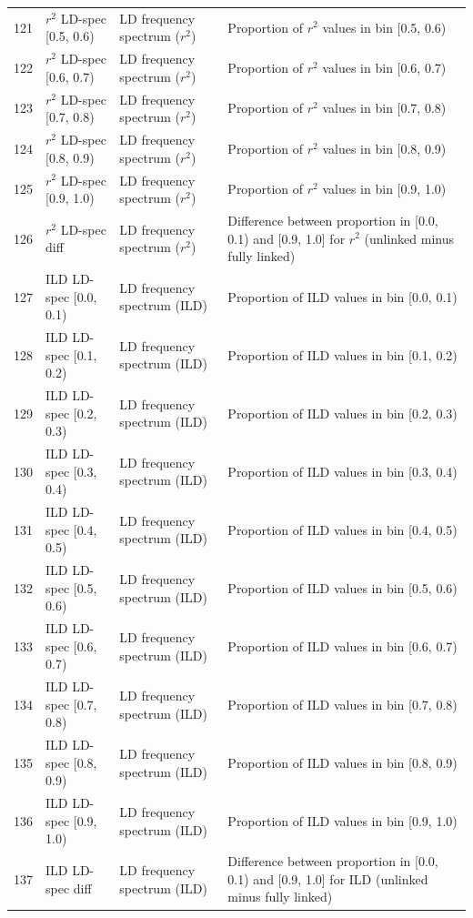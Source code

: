\begin{longtable}{@{}rllp{7.5cm}@{}}
121 & $r^2$ LD-spec [0.5, 0.6) & LD frequency spectrum ($r^2$) & Proportion of $r^2$ values in bin [0.5, 0.6) \\
122 & $r^2$ LD-spec [0.6, 0.7) & LD frequency spectrum ($r^2$) & Proportion of $r^2$ values in bin [0.6, 0.7) \\
123 & $r^2$ LD-spec [0.7, 0.8) & LD frequency spectrum ($r^2$) & Proportion of $r^2$ values in bin [0.7, 0.8) \\
124 & $r^2$ LD-spec [0.8, 0.9) & LD frequency spectrum ($r^2$) & Proportion of $r^2$ values in bin [0.8, 0.9) \\
125 & $r^2$ LD-spec [0.9, 1.0) & LD frequency spectrum ($r^2$) & Proportion of $r^2$ values in bin [0.9, 1.0) \\
126 & $r^2$ LD-spec diff & LD frequency spectrum ($r^2$) & Difference between proportion in [0.0, 0.1) and [0.9, 1.0] for $r^2$ (unlinked minus fully linked) \\
\midrule
127 & ILD LD-spec [0.0, 0.1) & LD frequency spectrum (ILD) & Proportion of ILD values in bin [0.0, 0.1) \\
128 & ILD LD-spec [0.1, 0.2) & LD frequency spectrum (ILD) & Proportion of ILD values in bin [0.1, 0.2) \\
129 & ILD LD-spec [0.2, 0.3) & LD frequency spectrum (ILD) & Proportion of ILD values in bin [0.2, 0.3) \\
130 & ILD LD-spec [0.3, 0.4) & LD frequency spectrum (ILD) & Proportion of ILD values in bin [0.3, 0.4) \\
131 & ILD LD-spec [0.4, 0.5) & LD frequency spectrum (ILD) & Proportion of ILD values in bin [0.4, 0.5) \\
132 & ILD LD-spec [0.5, 0.6) & LD frequency spectrum (ILD) & Proportion of ILD values in bin [0.5, 0.6) \\
133 & ILD LD-spec [0.6, 0.7) & LD frequency spectrum (ILD) & Proportion of ILD values in bin [0.6, 0.7) \\
134 & ILD LD-spec [0.7, 0.8) & LD frequency spectrum (ILD) & Proportion of ILD values in bin [0.7, 0.8) \\
135 & ILD LD-spec [0.8, 0.9) & LD frequency spectrum (ILD) & Proportion of ILD values in bin [0.8, 0.9) \\
136 & ILD LD-spec [0.9, 1.0) & LD frequency spectrum (ILD) & Proportion of ILD values in bin [0.9, 1.0) \\
137 & ILD LD-spec diff & LD frequency spectrum (ILD) & Difference between proportion in [0.0, 0.1) and [0.9, 1.0] for ILD (unlinked minus fully linked) \\

\end{longtable}
